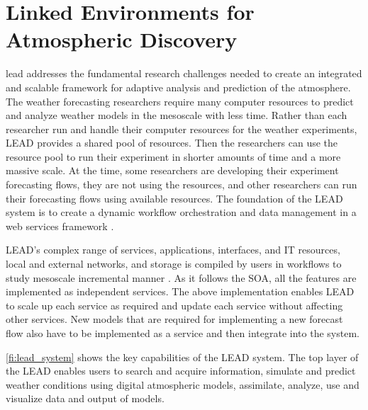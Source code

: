 \section{Linked Environments for Atmospheric Discovery}
\label{se:lead}

\acrfull{lead} \cite{Droegemeier2005Service-orientedWeather} addresses the fundamental research challenges needed to create an integrated and scalable framework for adaptive analysis and prediction of the atmosphere. The weather forecasting researchers require many computer resources to predict and analyze weather models in the mesoscale with less time. Rather than each researcher run and handle their computer resources for the weather experiments, LEAD provides a shared pool of resources. Then the researchers can use the resource pool to run their experiment in shorter amounts of time and a more massive scale. At the time, some researchers are developing their experiment forecasting flows, they are not using the resources, and other researchers can run their forecasting flows using available resources. The foundation of the LEAD system is to create a dynamic workflow orchestration and data management in a web services framework \cite{Droegemeier2005Service-orientedWeather}.

LEAD's complex range of services, applications, interfaces, and IT resources, local and external networks, and storage is compiled by users in workflows to study mesoscale incremental manner \cite{Droegemeier2005Service-orientedWeather}. As it follows the SOA, all the features are implemented as independent services. The above implementation enables LEAD to scale up each service as required and update each service without affecting other services. New models that are required for implementing a new forecast flow also have to be implemented as a service and then integrate into the system.

\cref{fi:lead_system} shows the key capabilities of the LEAD system. The top layer of the LEAD enables users to search and acquire information, simulate and predict weather conditions using digital atmospheric models, assimilate, analyze, use and visualize data and output of models.

